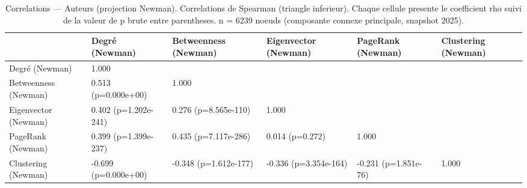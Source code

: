 \begin{table}
\caption{Correlations — Auteurs (projection Newman). Correlations de Spearman (triangle inferieur). Chaque cellule presente le coefficient rho suivi de la valeur de p brute entre parentheses. n = 6239 noeuds (composante connexe principale, snapshot 2025).}
\label{tab:corr_heatmap_corr_auteurs_newman}
\begin{tabular}{llllll}
\toprule
 & Degré (Newman) & Betweenness (Newman) & Eigenvector (Newman) & PageRank (Newman) & Clustering (Newman) \\
\midrule
Degré (Newman) & 1.000 &  &  &  &  \\
Betweenness (Newman) & 0.513
(p=0.000e+00) & 1.000 &  &  &  \\
Eigenvector (Newman) & 0.402
(p=1.202e-241) & 0.276
(p=8.565e-110) & 1.000 &  &  \\
PageRank (Newman) & 0.399
(p=1.399e-237) & 0.435
(p=7.117e-286) & 0.014
(p=0.272) & 1.000 &  \\
Clustering (Newman) & -0.699
(p=0.000e+00) & -0.348
(p=1.612e-177) & -0.336
(p=3.354e-164) & -0.231
(p=1.851e-76) & 1.000 \\
\bottomrule
\end{tabular}
\end{table}
